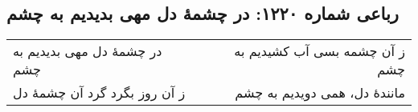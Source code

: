 \begin{center}
\section*{رباعی شماره ۱۲۲۰: در چشمهٔ دل مهی بدیدیم به چشم}
\label{sec:1220}
\begin{longtable}{l p{0.5cm} r}
در چشمهٔ دل مهی بدیدیم به چشم
&&
ز آن چشمه بسی آب کشیدیم به چشم
\\
ز آن روز بگرد گرد آن چشمهٔ دل
&&
مانندهٔ دل، همی دویدیم به چشم
\\
\end{longtable}
\end{center}
